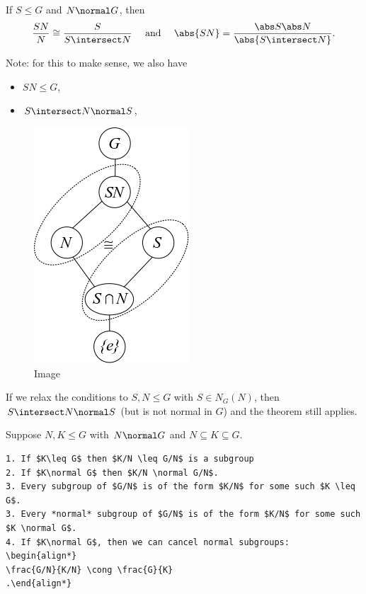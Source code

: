 \begin{theorem}

If \(S \leq G\) and \(N \normal G\), then
\begin{align*}
\frac{SN}{N} \cong \frac{S}{S\intersect N} \quad \text{ and }\quad \abs{SN} = \frac{\abs S \abs N}{\abs{S\intersect N}}
.\end{align*}

Note: for this to make sense, we also have

\begin{itemize}
\tightlist
\item
  \(SN \leq G\),
\item
  \(S\intersect N \normal S\),
\end{itemize}

\begin{figure}
\centering
\includegraphics{figures/2020-01-01-15-20-27.png}
\caption{Image}
\end{figure}

\end{theorem}

\begin{corollary}

If we relax the conditions to \(S, N \leq G\) with \(S \in N_G(N)\),
then \(S\intersect N \normal S\) (but is not normal in \(G\)) and the
theorem still applies.

\end{corollary}

\begin{theorem}

Suppose \(N, K \leq G\) with \(N \normal G\) and
\(N\subseteq K \subseteq G\).

\begin{verbatim}
1. If $K\leq G$ then $K/N \leq G/N$ is a subgroup
2. If $K\normal G$ then $K/N \normal G/N$.
3. Every subgroup of $G/N$ is of the form $K/N$ for some such $K \leq G$.
3. Every *normal* subgroup of $G/N$ is of the form $K/N$ for some such $K \normal G$.
4. If $K\normal G$, then we can cancel normal subgroups:
\begin{align*}
\frac{G/N}{K/N} \cong \frac{G}{K}
.\end{align*}
\end{verbatim}

\end{theorem}

